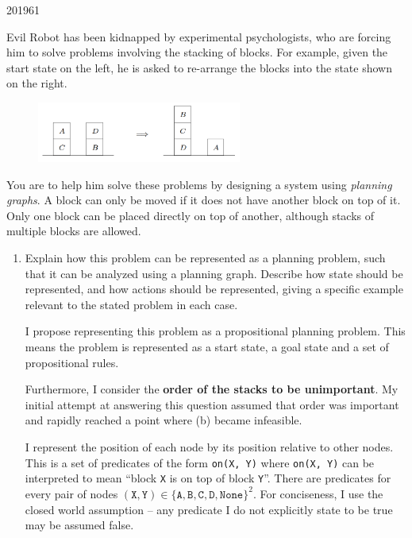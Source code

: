 \documentclass[10pt,\jkfside,a4paper]{article}
\begin{document}
\begin{examquestion}{2019}{6}{1}

Evil Robot has been kidnapped by experimental psychologists, who are
forcing him to solve problems involving the stacking of blocks. For
example, given the start state on the left, he is asked to re-arrange the
blocks into the state shown on the right.

\begin{figure}[H]
\centering
\includegraphics[width=0.6\textwidth]{2019planning}
\end{figure}

You are to help him solve these problems by designing a system using
\textit{planning graphs}. A block can only be moved if it does not have
another block on top of it. Only one block can be placed directly on top of
another, although stacks of multiple blocks are allowed.

\begin{enumerate}[label=(\alph*)]

\item Explain how this problem can be represented as a planning problem,
such that it can be analyzed using a planning graph. Describe how state
should be represented, and how actions should be represented, giving a
specific example relevant to the stated problem in each case.

I propose representing this problem as a propositional planning problem.
This means the problem is represented as a start state, a goal state and a
set of propositional rules.

Furthermore, I consider the \textbf{order of the stacks to be unimportant}.
My initial attempt at answering this question assumed that order was important
and rapidly reached a point where (b) became infeasible.

I represent the position of each node by its position relative to other
nodes. This is a set of predicates of the form \texttt{on(X, Y)} where
\texttt{on(X, Y)} can be interpreted to mean
``block \texttt{X} is on top of block \texttt{Y}''. There are predicates for
every pair of nodes $(\texttt{X}, \texttt{Y}) \in \{\texttt{A},
\texttt{B}, \texttt{C}, \texttt{D}, \texttt{None}\}^2$. For
conciseness, I use the closed world assumption -- any predicate I do not
explicitly state to be true may be assumed false.


\end{enumerate}
\end{examquestion}
\end{document}
